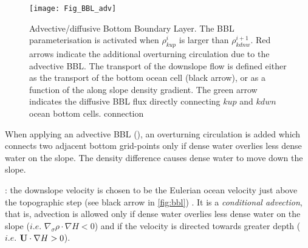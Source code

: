 \documentclass[../tex_main/NEMO_manual]{subfiles}
\begin{document}

\begin{figure}[!t] 	\begin{center}
\texttt{[image: Fig\_BBL\_adv]}
\caption{ 	\protect\label{fig:bbl}  
Advective/diffusive Bottom Boundary Layer. The BBL parameterisation is 
activated when $\rho^i_{kup}$ is larger than $\rho^{i+1}_{kdnw}$. 
Red arrows indicate the additional overturning circulation due to the advective BBL. 
The transport of the downslope flow is defined either as the transport of the bottom 
ocean cell (black arrow), or as a function of the along slope density gradient. 
The green arrow indicates the diffusive BBL flux directly connecting $kup$ and $kdwn$
ocean bottom cells.
connection}
\end{center}   \end{figure}




When applying an advective BBL (), an overturning 
circulation is added which connects two adjacent bottom grid-points only if dense 
water overlies less dense water on the slope. The density difference causes dense 
water to move down the slope. 

 : the downslope velocity is chosen to be the Eulerian
ocean velocity just above the topographic step (see black arrow in \autoref{fig:bbl}) 
\citep{Beckmann_Doscher1997}. It is a \textit{conditional advection}, that is, advection
is allowed only if dense water overlies less dense water on the slope ($i.e.$ 
$\nabla_\sigma \rho  \cdot  \nabla H<0$) and if the velocity is directed towards 
greater depth ($i.e.$ $\mathbf{U}  \cdot  \nabla H>0$).
\end{document}
